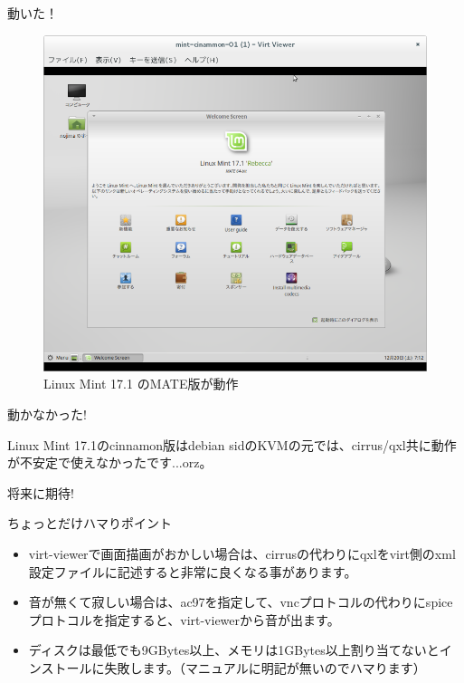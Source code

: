 \begin{frame}{動いた！}

\begin{figure}[H]
\centering
 \includegraphics[width=0.7\hsize]{image201412/mint-setupcomplete.png}
\caption{Linux Mint 17.1 のMATE版が動作}
\end{figure}
\end{frame}

\begin{frame}{動かなかった!}

  Linux Mint 17.1のcinnamon版はdebian sidのKVMの元では、cirrus/qxl共に動作が不安定で使えなかったです...orz。
  \begin{center}
   {\LARGE 将来に期待!}
  \end{center}
  
\end{frame}

\begin{frame}{ちょっとだけハマりポイント}

\begin{itemize}
\item virt-viewerで画面描画がおかしい場合は、cirrusの代わりにqxlをvirt側のxml設定ファイルに記述すると非常に良くなる事があります。
\item 音が無くて寂しい場合は、ac97を指定して、vncプロトコルの代わりにspiceプロトコルを指定すると、virt-viewerから音が出ます。
\item ディスクは最低でも9GBytes以上、メモリは1GBytes以上割り当てないとインストールに失敗します。（マニュアルに明記が無いのでハマります）
\end{itemize}
  
\end{frame}

